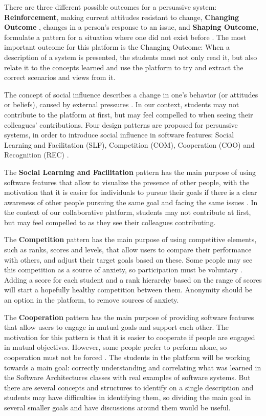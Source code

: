 \documentclass[conference]{IEEEtran}
\begin{document}
There are three different possible outcomes for a persuasive system: \textbf{Reinforcement}, making current attitudes resistant to change, \textbf{Changing Outcome }, changes in a person's response to an issue, and \textbf{Shaping Outcome}, formulate a pattern for a situation where one did not exist before \cite{oinas2008towards}. The most important outcome for this platform is the Changing Outcome: When a description of a system is presented, the students most not only read it, but also relate it to the concepts learned and use the platform to try and extract the correct scenarios and views from it.

The concept of social influence describes a change in one's behavior (or attitudes or beliefs), caused by external pressures \cite{guadagno2010preference}. In our context, students may not contribute to the platform at first, but may feel compelled to when seeing their colleagues' contributions. Four design patterns are proposed for persuasive systems, in order to introduce social influence in software features: Social Learning and Facilitation (SLF), Competition (COM), Cooperation (COO) and Recognition (REC) \cite{oduor2014persuasive}. 

The \textbf{Social Learning and Facilitation} pattern has the main purpose of using software features that allow to visualize the presence of other people, with the motivation that it is easier for individuals to pursue their goals if there is a clear awareness of other people pursuing the same goal and facing the same issues \cite{oduor2014persuasive}. In the context of our collaborative platform, students may not contribute at first, but may feel compelled to as they see their colleagues contributing.

The \textbf{Competition} pattern has the main purpose of using competitive elements, such as ranks, scores and levels, that allow users to compare their performance with others, and adjust their target goals based on these. Some people may see this competition as a source of anxiety, so participation must be voluntary \cite{oduor2014persuasive}. Adding a score for each student and a rank hierarchy based on the range of scores will start a hopefully healthy competition between them. Anonymity should be an option in the platform, to remove sources of anxiety.

The \textbf{Cooperation} pattern has the main purpose of providing software features that allow users to engage in mutual goals and support each other. The motivation for this pattern is that it is easier to cooperate if people are engaged in mutual objectives. However, some people prefer to perform alone, so cooperation must not be forced \cite{oduor2014persuasive}. The students in the platform will be working towards a main goal: correctly understanding and correlating what was learned in the Software Architectures classes with real examples of software systems. But there are several concepts and structures to identify on a single description and students may have difficulties in identifying them, so dividing the main goal in several smaller goals and have discussions around them would be useful.
\end{document}
